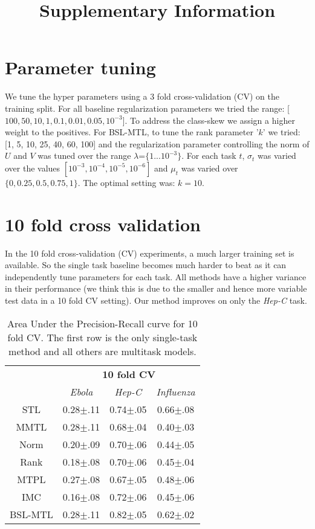 \documentclass[a4paper,11pt]{article}
\begin{document}
\title{Supplementary Information}

\section{Parameter tuning}
We tune the hyper parameters using a 3 fold cross-validation (CV) on the training split. For all baseline regularization parameters %
we tried the range: [$100, 50, 10, 1, 0.1, 0.01, 0.05, 10^{-3}$]. To address the class-skew we 
assign a higher weight to the positives. For BSL-MTL, to tune the rank parameter '$k$' we tried: [1, 5, 10, 25, 40, 60, 100] and the regularization parameter controlling the norm of $U$ and $V$ was tuned over the range $\lambda$=$\{1 ... 10^{-3}\}$. For each task $t$, $\sigma_t$ was varied over the values $[10^{-3}, 10^{-4}, 10^{-5}, 10^{-6}]$ and
$\mu_t$ was varied over $\{0, 0.25, 0.5, 0.75, 1\}$.
The optimal setting was:  $k=10$. %

\section{10 fold cross validation}
In the 10 fold cross-validation (CV) experiments, a much larger training set is available. So the single task baseline becomes much harder to beat as it can independently tune parameters for each task. All methods have a higher variance in their performance (we think this is due to the smaller and hence more variable test data in a 10 fold CV setting). Our method improves on only the \textit{Hep-C} task.

\begin{table*}[h]\caption{Area Under the Precision-Recall curve for 10 fold CV. The first row is the only single-task method and all others are multitask models.}
\label{resultsTable}
\begin{center}
\def\arraystretch{1.2}
\begin{tabular}{c|ccc}
\toprule
& \multicolumn{3}{c}{\textbf{10 fold CV}} \\
& \textit{Ebola} & \textit{Hep-C} & \textit{Influenza} \\ \midrule
 STL     & 0.28$\pm$.11 & 0.74$\pm$.05 & 0.66$\pm$.08  \\ 
 MMTL    & 0.28$\pm$.11 & 0.68$\pm$.04 & 0.40$\pm$.03  \\ 
 Norm    & 0.20$\pm$.09 & 0.70$\pm$.06 & 0.44$\pm$.05  \\ 
 Rank    & 0.18$\pm$.08 & 0.70$\pm$.06 & 0.45$\pm$.04  \\ 
 MTPL    & 0.27$\pm$.08 & 0.67$\pm$.05 & 0.48$\pm$.06  \\ 
 IMC     & 0.16$\pm$.08 & 0.72$\pm$.06 & 0.45$\pm$.06  \\ 
 BSL-MTL & 0.28$\pm$.11 & 0.82$\pm$.05 & 0.62$\pm$.02  \\ 
\bottomrule
\end{tabular}
\end{center}
\end{table*}
\end{document}
